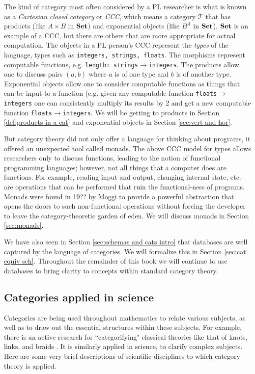 \documentclass{book}
\def\mc{\mathcal}
\def\to{\rightarrow}
\def\too{\longrightarrow}
\def\Set{{\bf Set}}
\def\mcT{\mc{T}}
\theoremstyle{remark}
\theoremstyle{definition}
\begin{document}
The kind of category most often considered by a PL researcher is what is known as a {\em Cartesian closed category} or {\em CCC}, which means a category $\mcT$ that has products (like $A\times B$ in $\Set$) and exponential objects (like $B^A$ in $\Set$). $\Set$ is an example of a CCC, but there are others that are more appropriate for actual computation. The objects in a PL person's CCC represent the {\em types} of the language, types such as {\tt integers, strings, floats}. The morphisms represent computable functions, e.g. {\tt length: strings}$\too${\tt integers}. The products allow one to discuss pairs $(a,b)$ where $a$ is of one type and $b$ is of another type. Exponential objects allow one to consider computable functions as things that can be input to a function (e.g. given any computable function {\tt floats}$\to${\tt integers} one can consistently multiply its results by 2 and get a new computable function {\tt floats}$\to${\tt integers}. We will be getting to products in Section \ref{def:products in a cat} and exponential objects in Section \ref{sec:vert and hor}. 

But category theory did not only offer a language for thinking about programs, it offered an unexpected tool called monads. The above CCC model for types allows researchers only to discuss functions, leading to the notion of functional programming languages; however, not all things that a computer does are functions. For example, reading input and output, changing internal state, etc. are operations that can be performed that ruin the functional-ness of programs. Monads were found in 19?? by Moggi \cite{Mog} to provide a powerful abstraction that opens the doors to such non-functional operations without forcing the developer to leave the category-theoretic garden of eden. We will discuss monads in Section \ref{sec:monads}.

We have also seen in Section \ref{sec:schemas and cats intro} that databases are well captured by the language of categories. We will formalize this in Section \ref{sec:cat equiv sch}. Throughout the remainder of this book we will continue to use databases to bring clarity to concepts within standard category theory. 
 

\subsection{Categories applied in science} 

Categories are being used throughout mathematics to relate various subjects, as well as to draw out the essential structures within these subjects. For example, there is an active research for ``categorifying" classical theories like that of knots, links, and braids \cite{Kho}. It is similarly applied in science, to clarify complex subjects. Here are some very brief descriptions of scientific disciplines to which category theory is applied.
\end{document}
